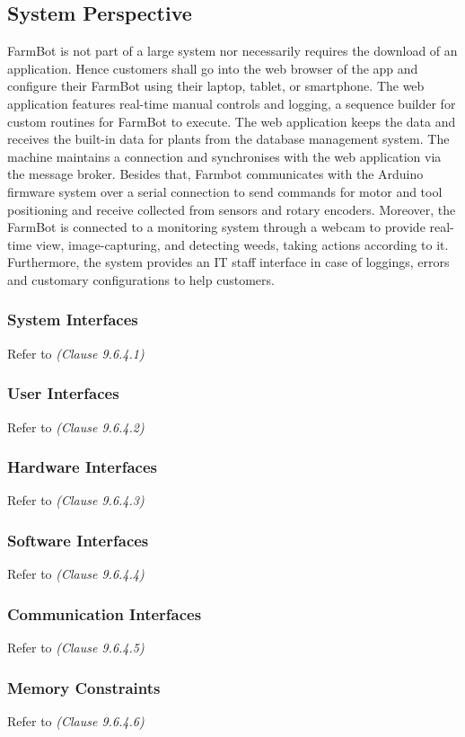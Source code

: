 \subsection{System Perspective}

FarmBot is not part of a large system nor necessarily requires the download of an application. Hence customers shall go into the web browser of the app and configure their FarmBot using their laptop, tablet, or smartphone.
The web application features real-time manual controls and logging, a sequence builder for custom routines for FarmBot to execute. The web application keeps the data and receives the built-in data for plants from the database management system. The machine maintains a connection and synchronises with the web application via the message broker. Besides that, Farmbot communicates with the Arduino firmware system over a serial connection to send commands for motor and tool positioning and receive collected from sensors and rotary encoders. Moreover, the FarmBot is connected to a monitoring system through a webcam to provide real-time view, image-capturing, and detecting weeds, taking actions according to it. Furthermore, the system provides an IT staff interface in case of loggings, errors and customary configurations to help customers.


\subsubsection{System Interfaces}
Refer to \textit{(Clause 9.6.4.1)}
\subsubsection{User Interfaces}
Refer to \textit{(Clause 9.6.4.2)}
\subsubsection{Hardware Interfaces}
Refer to \textit{(Clause 9.6.4.3)}
\subsubsection{Software Interfaces}
Refer to \textit{(Clause 9.6.4.4)}
\subsubsection{Communication Interfaces}
Refer to \textit{(Clause 9.6.4.5)}
\subsubsection{Memory Constraints}
Refer to \textit{(Clause 9.6.4.6)}

